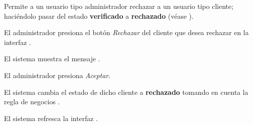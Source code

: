 %
%

{
  Permite a un usuario tipo administrador rechazar a un usuario tipo cliente;
  haciéndolo pasar del estado \textbf{verificado} a \textbf{rechazado} (véase
  ).

  \begin{trayectoriaPrincipal}

    \item El administrador presiona el botón \textit{Rechazar} del cliente que
      desea rechazar en la interfaz .

    \item El sistema muestra el mensaje .

    \item El administrador presiona \textit{Aceptar}.

    \item El sistema cambia el estado de dicho cliente a \textbf{rechazado}
      tomando en cuenta la regla de negocios .

    \item El sistema refresca la interfaz .

  \end{trayectoriaPrincipal}
}
